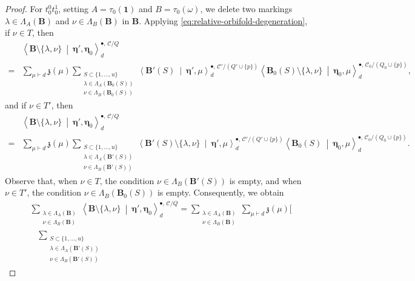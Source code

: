 \documentclass[10pt,a4paper]{amsart}
\newcommand{\cC}{\mathcal C}
\newcommand{\id}{\mathbf 1}
\begin{document}
\begin{proof}
For $t^0_0t^1_0$, setting $A=\tau_0(\id)$ and $B=\tau_0(\omega)$, we delete two markings $\lambda\in\Lambda_A(\mathbf B)$ and $\nu\in\Lambda_B(\mathbf B)$ in $\mathbf B$. Applying \eqref{eq:relative-orbifold-degeneration}, if $\nu\in T$, then
\[
\begin{aligned}
 &\left\langle\mathbf B\setminus\{\lambda,\nu\}
 \ \middle|\ \boldsymbol\eta',\boldsymbol\eta_0\right\rangle_d^{\bullet,\,\cC/Q}
\\
={}&\sum_{\mu\vdash d}\mathfrak z(\mu)
\sum_{\substack{S\subset\{1,\ldots,u\}\\\lambda\in\Lambda_A(\mathbf B_0(S))\\\nu\in\Lambda_B(\mathbf B_0(S))}}
 \left\langle\mathbf B'(S)\ \middle|\ \boldsymbol\eta',\mu\right\rangle_d^{\bullet,\,\cC'/(Q'\cup\{p\})}
 \left\langle\mathbf B_0(S)\setminus\{\lambda,\nu\}
 \ \middle|\ \boldsymbol\eta_0,\mu\right\rangle_d^{\bullet,\,\cC_0/(Q_0\cup\{p\})},
\end{aligned}
\]
and if $\nu\in T'$, then
\[
\begin{aligned}
&\left\langle\mathbf B\setminus\{\lambda,\nu\}
 \ \middle|\ \boldsymbol\eta',\boldsymbol\eta_0\right\rangle_d^{\bullet,\,\cC/Q}
\\
={}&\sum_{\mu\vdash d}\mathfrak z(\mu)
 \sum_{\substack{S\subset\{1,\ldots,u\}\\\lambda\in\Lambda_A(\mathbf B'(S))\\\nu\in\Lambda_B(\mathbf B'(S))}}
 \left\langle\mathbf B'(S)\setminus\{\lambda,\nu\}
 \ \middle|\ \boldsymbol\eta',\mu\right\rangle_d^{\bullet,\,\cC'/(Q'\cup\{p\})}
 \left\langle\mathbf B_0(S)\ \middle|\ \boldsymbol\eta_0,\mu\right\rangle_d^{\bullet,\,\cC_0/(Q_0\cup\{p\})}.
\end{aligned}
\]
Observe that, when $\nu\in T$, the condition $\nu\in\Lambda_B(\mathbf B'(S))$ is empty, and when $\nu\in T'$, the condition $\nu\in\Lambda_B(\mathbf B_0(S))$ is empty. Consequently, we obtain
\[
\begin{aligned}
&\sum_{\substack{\lambda\in\Lambda_A(\mathbf B)\\\nu\in\Lambda_B(\mathbf B)}}
 \left\langle\mathbf B\setminus\{\lambda,\nu\}
 \ \middle|\ \boldsymbol\eta',\boldsymbol\eta_0\right\rangle_d^{\bullet,\,\cC/Q}
={}\sum_{\substack{\lambda\in\Lambda_A(\mathbf B)\\\nu\in\Lambda_B(\mathbf B)}}\sum_{\mu\vdash d}\mathfrak z(\mu)\Bigg[
\\[-2mm]
&\quad
 \sum_{\substack{S\subset\{1,\ldots,u\}\\\lambda\in\Lambda_A(\mathbf B'(S))\\\nu\in\Lambda_B(\mathbf B'(S))}}

\end{aligned}\]
\end{proof}
\end{document}
